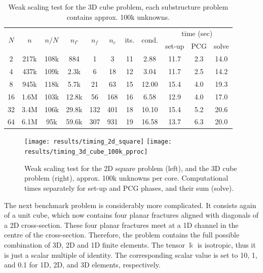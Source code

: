\begin{table}[ptbh]
\begin{center}
\begin{tabular}
[c]{|ccc|ccc|cc|ccc|}\hline
\multirow{2}{*}{$N$} & \multirow{2}{*}{$n$} & \multirow{2}{*}{$n/N$} &
\multirow{2}{*}{$n_{\Gamma}$} & \multirow{2}{*}{$n_f$} &
\multirow{2}{*}{$n_c$} & \multirow{2}{*}{its.} & \multirow{2}{*}{cond.} &
\multicolumn{3}{c|}{time (sec)}\\
&  &  &  &  &  &  &  & set-up & PCG & solve\\\hline
2 & 217k & 108k & 884 & 1 & 3 & 11 & 2.88 & 11.7 & 2.3 & 14.0\\
4 & 437k & 109k & 2.3k & 6 & 18 & 12 & 3.04 & 11.7 & 2.5 & 14.2\\
8 & 945k & 118k & 5.7k & 21 & 63 & 15 & 12.00 & 15.4 & 4.0 & 19.3\\
16 & 1.6M & 103k & 12.8k & 56 & 168 & 16 & 6.58 & 12.9 & 4.0 & 17.0\\
32 & 3.4M & 106k & 29.8k & 132 & 401 & 18 & 10.10 & 15.4 & 5.2 & 20.6\\
64 & 6.1M & 95k & 59.6k & 307 & 931 & 19 & 16.58 & 13.7 & 6.3 & 20.0\\\hline
\end{tabular}
\end{center}
\caption{\label{tab:3d_cube_100k_weak_scaling}
Weak scaling test for the 3D cube problem, each substructure problem
contains approx. 100k unknowns.}
\end{table}

\begin{figure}[ptbh]
\begin{center}
\texttt{[image: results/timing\_2d\_square]} 
\texttt{[image: results/timing\_3d\_cube\_100k\_pproc]}
\end{center}
\caption{\label{fig:timing_100k}
Weak scaling test for the 2D square problem (left), and the 3D cube
problem (right), approx. 100k unknowns per core.
Computational times separately
for set-up and PCG phases, and their sum (solve).}
\end{figure}

The next benchmark problem is considerably more complicated. It consists again
of a unit cube, which now contains four planar fractures aligned with
diagonals of a 2D cross-section. These four planar fractures meet at a 1D
channel in the centre of the cross-section. Therefore, the problem contains
the full possible combination of 3D, 2D and 1D finite elements. The tensor
$\Bbbk$ is isotropic, thus it is just a scalar multiple of identity. 
The corresponding scalar value is set to 10, 1, and 0.1 for 1D, 2D, and 3D elements, respectively.

